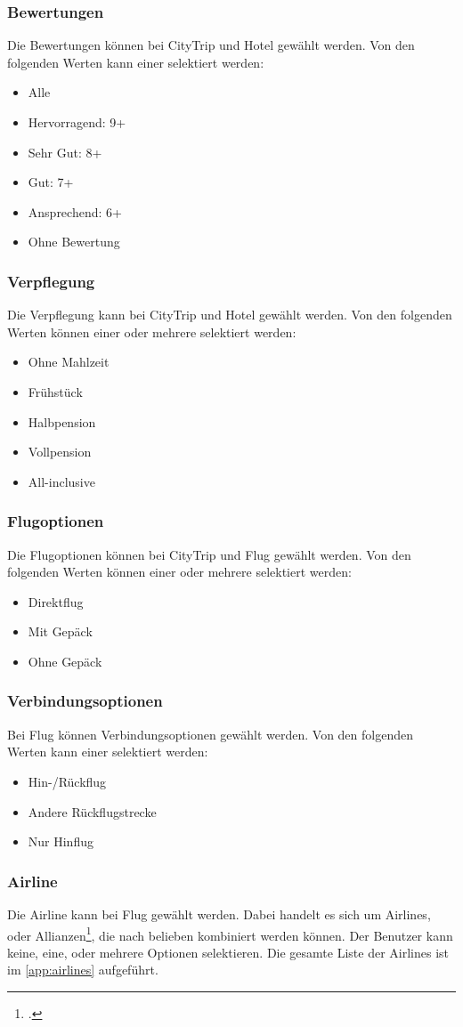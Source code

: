 \subsubsection{Bewertungen}
Die Bewertungen können bei CityTrip und Hotel gewählt werden. Von den folgenden Werten kann einer selektiert werden:
\begin{itemize}
\item Alle
\item Hervorragend: 9+
\item Sehr Gut: 8+
\item Gut: 7+
\item Ansprechend: 6+
\item Ohne Bewertung
\end{itemize}

\subsubsection{Verpflegung}
Die Verpflegung kann bei CityTrip und Hotel gewählt werden. Von den folgenden Werten können einer oder mehrere selektiert werden:
\begin{itemize}
\item Ohne Mahlzeit
\item Frühstück
\item Halbpension
\item Vollpension
\item All-inclusive
\end{itemize}

\subsubsection{Flugoptionen}
Die Flugoptionen können bei CityTrip und Flug gewählt werden. Von den folgenden Werten können einer oder mehrere selektiert werden:
\begin{itemize}
\item Direktflug
\item Mit Gepäck
\item Ohne Gepäck
\end{itemize}

\subsubsection{Verbindungsoptionen}
Bei Flug können Verbindungsoptionen gewählt werden. Von den folgenden Werten kann einer selektiert werden:
\begin{itemize}
\item Hin-/Rückflug
\item Andere Rückflugstrecke
\item Nur Hinflug
\end{itemize}

\subsubsection{Airline}
Die Airline kann bei Flug gewählt werden. Dabei handelt es sich um Airlines, oder Allianzen\footcite{Airline_alliance}, die nach belieben kombiniert werden können. Der Benutzer kann keine, eine, oder mehrere Optionen selektieren. Die gesamte Liste der Airlines ist im \cref{app:airlines}  aufgeführt.